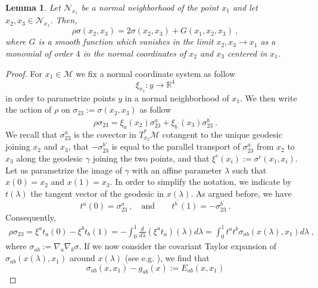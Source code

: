 \documentclass[11pt]{book}
\newcommand{\Mcal}{\mathcal{M}}
\newcommand{\Ncal}{\mathcal{N}}
\newcommand{\Rbb}{\mathbb{R}}
\theoremstyle{break}
\newtheorem{lemma}{Lemma}[chapter]
\begin{document}
\begin{lemma}\label{lem:rho_over_squared}
Let $\Ncal_{x_1}$ be a normal neighborhood of the point $x_1$ and let $x_2,x_3 \in \Ncal_{x_1}$. Then,
%
\begin{equation*}
\rho \sigma(x_2,x_3) = 2\sigma(x_2,x_3) + G(x_1,x_2,x_3) \ ,
\end{equation*}
%
where $G$ is a smooth function which vanishes in the limit $x_2,x_3 \to x_1$ as a monomial of order $4$ in the normal coordinates of $x_2$ and $x_3$ centered in $x_1$. 
\end{lemma}


\begin{proof}
For $x_1 \in \Mcal$ we fix a normal coordinate system as follow
%
\begin{equation*}
\xi_{x_1} : y \to \Rbb^4 
\end{equation*}
%
in order to parametrize points $y$ in a normal neighborhood of $x_1$. We then write the action of $\rho$ on $\sigma_{23}:=\sigma(x_2,x_3)$ as follow
%
\begin{equation*}
\rho \sigma_{23} = \xi_a(x_2) \sigma^a_{23} + \xi_{b^\prime}(x_3)\sigma^{b^\prime}_{23} \ . 
\end{equation*}
%
We recall that $\sigma_{23}^a$ is the covector in $T^*_{x_2}\Mcal$ cotangent to the unique geodesic joining $x_2$ and $x_3$, that $-\sigma^{b'}_{23}$ is equal to the parallel transport of $\sigma^a_{23}$ from $x_2$ to $x_3$ along the geodesic $\gamma$ joining the two points, and that $\xi^c(x_i):=\sigma^c(x_1,x_i)$.
%
Let us parametrize the image of $\gamma$ with an affine parameter $\lambda$ such that $x(0) = x_2$ and $x(1) = x_3$. In order to simplify the notation, we indicate by $t(\lambda)$ the tangent vector of the geodesic in $x(\lambda)$. As argued before, we have
%
\begin{equation*}
t^a(0)=\sigma^a_{23}\ , \quad \mbox{and} \qquad t^{b^\prime}(1)=-\sigma^{b^\prime}_{23} \ . 
\end{equation*}
%
Consequently,
%
\begin{eqnarray*}
\rho \sigma_{23} = \xi^a t_a (0) - \xi^b t_b(1) = - \int_{0}^{1} \frac{d}{d\lambda} (\xi^a t_a)(\lambda) d\lambda = \int_{0}^{1} t^a t^b \sigma_{ab}(x(\lambda),x_1) d\lambda \ ,
\end{eqnarray*}
where $\sigma_{ab} := \nabla_a\nabla_b \sigma$. If we now consider the covariant Taylor expansion of $\sigma_{ab}(x(\lambda),x_1)$ around $x(\lambda)$ (see e.g. \cite{PPV_2011}), we find that 
%
\begin{equation*}
\sigma_{ab}(x,x_1) - g_{ab}(x) := E_{ab}(x,x_1)

\end{equation*}
\end{proof}
\end{document}
